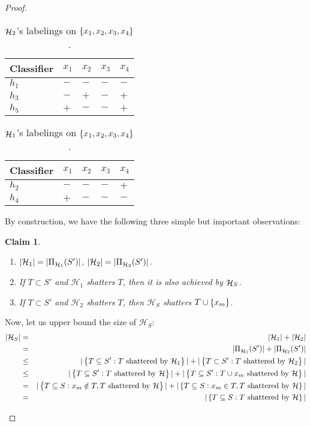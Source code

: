 \documentclass{article}
\newtheorem{claim}{Claim}
\DeclareMathOperator*{\Hcal}{{\cal H}}
\begin{document}
\begin{proof}
\begin{itemize}
\begin{minipage}{0.45\linewidth}
\begin{table}[H]
\centering
\begin{tabular}{l|llll}
Classifier & $x_1$ & $x_2$ & $x_3$ & $x_4$ \\
\hline
$h_1$ & $-$ & $-$ & $-$ & $-$ \\
$h_3$ & $-$ & $+$ & $-$ & $+$ \\
$h_5$ & $+$ & $-$ & $-$ & $+$ \\
\end{tabular}
\caption{$\Hcal_2$'s labelings on
$\cbr{x_1,x_2,x_3,x_4}$.}
\label{tab:h_1}
\end{table}
\end{minipage}
\begin{minipage}{0.45\linewidth}
\begin{table}[H]
\centering
\begin{tabular}{l|llll}
Classifier & $x_1$ & $x_2$ & $x_3$ & $x_4$ \\
\hline
$h_2$ & $-$ & $-$ & $-$ & $+$ \\
$h_4$ & $+$ & $-$ & $-$ & $-$ \\
\end{tabular}
\vspace{0.45cm}
\caption{$\Hcal_1$'s labelings on
$\cbr{x_1,x_2,x_3,x_4}$.}
\label{tab:h_2}
\end{table}
\end{minipage}

By construction, we have the following three simple but important observations:
\begin{claim}
\begin{enumerate}
\item $|\mathcal{H}_1| = |\Pi_{\Hcal_1}(S')|$, $|\mathcal{H}_2| = |\Pi_{\Hcal_2}(S')|$.
\item If $T \subset S'$ and $\mathcal{H}_1$ shatters $T$, then it is also achieved by $\Hcal_S$.
\item If $T \subset S'$ and $\mathcal{H}_2$ shatters $T$, then $\mathcal{H}_S$ shatters $T \cup \cbr{x_m}$.
\label{claim:obs}
\end{enumerate}
\end{claim}

Now, let us upper bound the size of $\mathcal{H}_S$:
\begin{eqnarray*}
|\mathcal{H}_S| &=& |\mathcal{H}_1| + |\mathcal{H}_2| \\
&=& |\Pi_{\Hcal_1}(S')| + |\Pi_{\Hcal_2}(S')| \\
&\leq& |\cbr{T \subseteq S': T \text{ shattered by } \mathcal{H}_1}| + |\cbr{T \subset S': T \text{ shattered by } \mathcal{H}_2}| \\
&\leq& |\cbr{T \subseteq S': T \text{ shattered by } \mathcal{H}}| + |\cbr{T \subseteq S': T \cup {x_m} \text{ shattered by } \mathcal{H}}| \\
&=& |\cbr{T \subseteq S: x_m \notin T, T \text{ shattered by } \mathcal{H}}| + |\cbr{T \subseteq S: x_m \in T, T \text{ shattered by } \mathcal{H}}| \\
&=& |\cbr{T \subseteq S: T \text{ shattered by } \mathcal{H}}|
\end{eqnarray*}


\end{itemize}
\end{proof}
\end{document}
